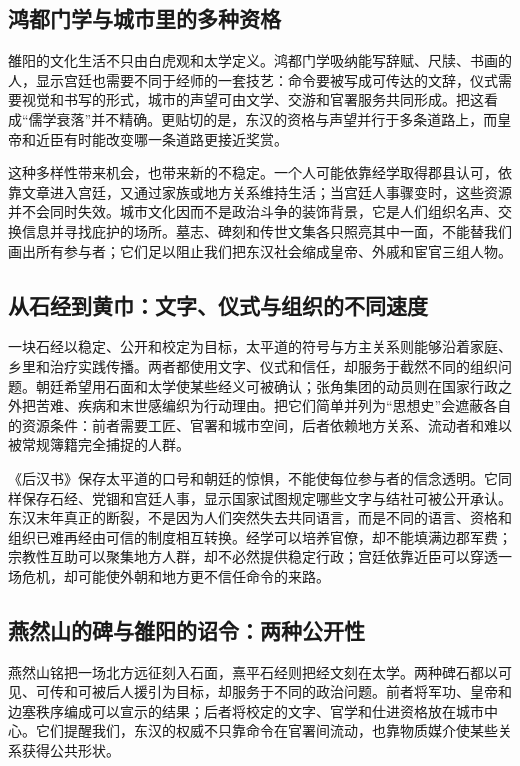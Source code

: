 \subsection{鸿都门学与城市里的多种资格}

雒阳的文化生活不只由白虎观和太学定义。鸿都门学吸纳能写辞赋、尺牍、书画的人，显示宫廷也需要不同于经师的一套技艺：命令要被写成可传达的文辞，仪式需要视觉和书写的形式，城市的声望可由文学、交游和官署服务共同形成。把这看成“儒学衰落”并不精确。更贴切的是，东汉的资格与声望并行于多条道路上，而皇帝和近臣有时能改变哪一条道路更接近奖赏。

这种多样性带来机会，也带来新的不稳定。一个人可能依靠经学取得郡县认可，依靠文章进入宫廷，又通过家族或地方关系维持生活；当宫廷人事骤变时，这些资源并不会同时失效。城市文化因而不是政治斗争的装饰背景，它是人们组织名声、交换信息并寻找庇护的场所。墓志、碑刻和传世文集各只照亮其中一面，不能替我们画出所有参与者；它们足以阻止我们把东汉社会缩成皇帝、外戚和宦官三组人物。

\subsection{从石经到黄巾：文字、仪式与组织的不同速度}

一块石经以稳定、公开和校定为目标，太平道的符号与方主关系则能够沿着家庭、乡里和治疗实践传播。两者都使用文字、仪式和信任，却服务于截然不同的组织问题。朝廷希望用石面和太学使某些经义可被确认；张角集团的动员则在国家行政之外把苦难、疾病和末世感编织为行动理由。把它们简单并列为“思想史”会遮蔽各自的资源条件：前者需要工匠、官署和城市空间，后者依赖地方关系、流动者和难以被常规簿籍完全捕捉的人群。

《后汉书》保存太平道的口号和朝廷的惊惧，不能使每位参与者的信念透明。它同样保存石经、党锢和宫廷人事，显示国家试图规定哪些文字与结社可被公开承认。东汉末年真正的断裂，不是因为人们突然失去共同语言，而是不同的语言、资格和组织已难再经由可信的制度相互转换。经学可以培养官僚，却不能填满边郡军费；宗教性互助可以聚集地方人群，却不必然提供稳定行政；宫廷依靠近臣可以穿透一场危机，却可能使外朝和地方更不信任命令的来路。

\subsection{燕然山的碑与雒阳的诏令：两种公开性}

燕然山铭把一场北方远征刻入石面，熹平石经则把经文刻在太学。两种碑石都以可见、可传和可被后人援引为目标，却服务于不同的政治问题。前者将军功、皇帝和边塞秩序编成可以宣示的结果；后者将校定的文字、官学和仕进资格放在城市中心。它们提醒我们，东汉的权威不只靠命令在官署间流动，也靠物质媒介使某些关系获得公共形状。

